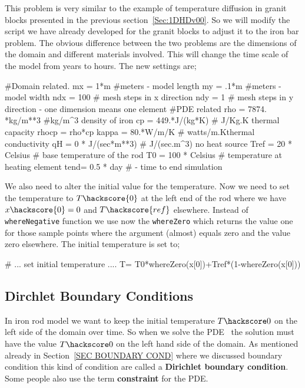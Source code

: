 This problem is very similar to the example of temperature diffusion in granit blocks presented in the previous section~\ref{Sec:1DHDv00}. So we will modify the script we have already developed for the granit blocks to adjust 
it to the iron bar problem.  
The obvious difference between the two problems are the dimensions of the domain and different materials involved. This will change the time scale of the model from years to hours. 
The new settings are;
\begin{python}
#Domain related.
mx = 1*m #meters - model length
my = .1*m #meters - model width
ndx = 100 # mesh steps in x direction 
ndy = 1 # mesh steps in y direction - one dimension means one element
#PDE related
rho = 7874. *kg/m**3 #kg/m^{3} density of iron
cp = 449.*J/(kg*K) # J/Kg.K thermal capacity
rhocp = rho*cp 
kappa = 80.*W/m/K   # watts/m.Kthermal conductivity
qH = 0 * J/(sec*m**3) # J/(sec.m^{3}) no heat source
Tref = 20 * Celsius  # base temperature of the rod
T0 = 100 * Celsius # temperature at heating element
tend= 0.5 * day # - time to end simulation
\end{python}
We also need to alter the initial value for the temperature. Now we need to set the 
temperature to $T\hackscore{0}$ at the left end of the rod where we have $x\hackscore{0}=0$ and 
$T\hackscore{ref}$ elsewhere. Instead of \verb|whereNegative| function we use now the 
\verb|whereZero| which returns the value one for those sample points where 
the argument (almost) equals zero and the value zero elsewhere. The initial
temperature is set to;
\begin{python}
# ... set initial temperature ....
T= T0*whereZero(x[0])+Tref*(1-whereZero(x[0]))
\end{python}

\subsection{Dirchlet Boundary Conditions}
In iron rod model  we want to keep the initial temperature $T\hackscore0$ on the left side of the domain over time. 
So when we solve the PDE~ the solution must have the value $T\hackscore0$ on the left hand
side of the domain. As mentioned already in Section~\ref{SEC BOUNDARY COND} where we discussed
boundary condition this kind of condition are called a \textbf{Dirichlet boundary condition}. Some people also
use the term \textbf{constraint} for the PDE. 

